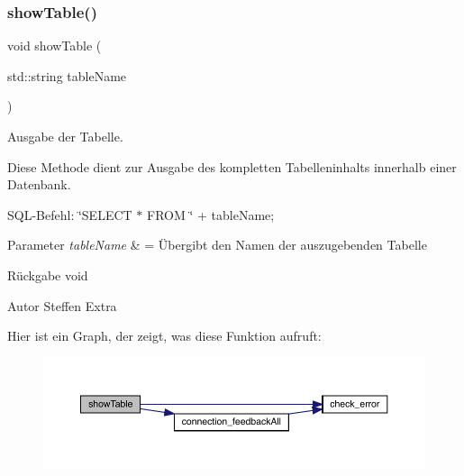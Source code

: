 \subsubsection{show\+Table()}
{\footnotesize\ttfamily void show\+Table (\begin{DoxyParamCaption}\item[{std\+::string}]{table\+Name }\end{DoxyParamCaption})}



Ausgabe der Tabelle. 

Diese Methode dient zur Ausgabe des kompletten Tabelleninhalts innerhalb einer Datenbank.~\newline


S\+Q\+L-\/\+Befehl\+: \char`\"{}\+S\+E\+L\+E\+C\+T $\ast$ F\+R\+O\+M \char`\"{} + table\+Name;


\begin{DoxyParams}{Parameter}
{\em table\+Name} & = Übergibt den Namen der auszugebenden Tabelle\\
\hline
\end{DoxyParams}
\begin{DoxyReturn}{Rückgabe}
void
\end{DoxyReturn}
\begin{DoxyAuthor}{Autor}
Steffen Extra 
\end{DoxyAuthor}
Hier ist ein Graph, der zeigt, was diese Funktion aufruft\+:\nopagebreak
\begin{figure}[H]
\begin{center}
\leavevmode
\includegraphics[width=350pt]{tables_8hpp_a22fbeb7f18a00bafd4864de51a3bca28_cgraph}
\end{center}
\end{figure}
